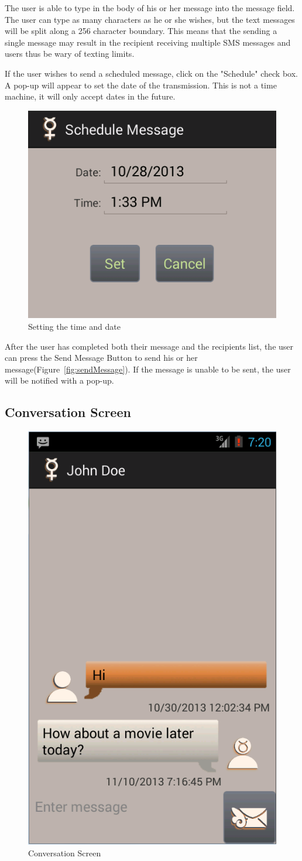 \documentclass{article}
\begin{document}
\par The user is able to type in the body of his or her message into the message field. The user can type as many characters as he or she wishes, but the text messages will be split along a 256 character boundary.
This means that the sending a single message may result in the recipient receiving multiple SMS messages and users thus be wary of texting limits.

\par If the user wishes to send a scheduled message, click on the "Schedule" check box. A pop-up will appear to set the date of the transmission. This is not a time machine, it will only accept dates in the future.

\begin{figure}[h!]
\centering
\includegraphics[width=.25\textwidth]{"./Screen_shots/Schedule_Message_Popup"}{}
\caption{Setting the time and date}
\label{fig:SchedPopUp}
\end{figure}



\par After the user has completed both their message and the recipients list, the user can press the Send Message Button to send his or her message(Figure~\ref{fig:sendMessage}).
If the message is unable to be sent, the user will be notified with a pop-up.



\pagebreak

\subsection{Conversation Screen}
\label{sec:Conversation}

\begin{figure}[ht!]
\centering
\includegraphics[width=.25\textwidth]{"./Screen_shots/Conversation_Screen"}{}
\caption{Conversation Screen}
\label{fig:ConversationScreen}
\end{figure}
\end{document}
